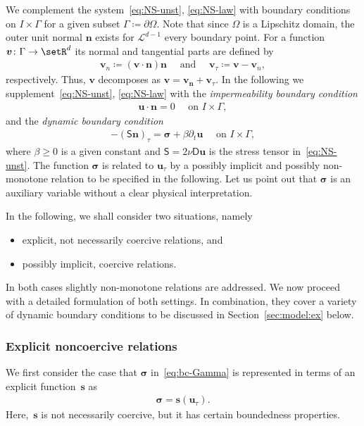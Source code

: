 \documentclass[reqno,a4paper]{amsart}
\def\tens#1{\pmb{\mathsf{#1}}}
\def\vec#1{\boldsymbol{#1}}
\def\bn{\vec{n}}
\def\bs{\vec{s}}
\def\bu{\vec{u}}
\def\bv{\vec{v}}
\def\bsigma{\vec{\sigma}}
\def\BD{\tens{D}}
\def\BS{\tens{S}}
\begin{document}
	We complement the system~\eqref{eq:NS-unst}, \eqref{eq:NS-law} with boundary conditions on $I \times \Gamma$ for a given subset $\Gamma \coloneqq \partial \Omega$. 
	Note that since $\Omega$ is a Lipschitz domain, the outer unit normal $\bn$ exists for $\mathcal{L}^{d-1}$ every boundary point. 
	For a function $\bv \colon \Gamma \to \setR^d$ its normal and tangential parts are defined by 
	\begin{align*}
		\bv_n  \coloneqq (\bv \cdot \bn) \bn 
		\quad \text{ and } \quad 
		\bv_{\tau} \coloneqq \bv - \bv_n,
	\end{align*}
	respectively. 
	Thus, $\bv$ decomposes as $\bv = \bv_{\bn} + \bv_{\tau}$. 
	In the following we supplement~\eqref{eq:NS-unst}, \eqref{eq:NS-law} with the \emph{impermeability boundary condition} 
	\begin{align}\label{eq:imperm}
		\bu \cdot \bn = 0 \quad \text{ on } I\times\Gamma,
	\end{align}	
	and the \emph{dynamic boundary condition}
	\begin{align}\label{eq:bc-Gamma}
		- (\BS \bn)_{\tau} = \bsigma + \beta \partial_t \bu \quad \text{ on } I\times\Gamma, 
	\end{align}
	where $\beta\geq 0$ is a given constant and $\BS = 2 \nu \BD \bu$ is the stress tensor in~\eqref{eq:NS-unst}. 
	The function $\bsigma$ is related to $\bu_{\tau}$ by a possibly implicit and possibly non-monotone relation to be specified in the following. 
	Let us point out that $\bsigma$ is an auxiliary variable without a clear physical interpretation. 
	
	In the following, we shall consider two situations, namely
	\begin{itemize}		
		\item 
		explicit, not necessarily coercive relations, and 
		\item 
		possibly implicit, coercive relations. 
	\end{itemize}
	In both cases slightly non-monotone relations are addressed. 
	We now proceed with a detailed formulation of both settings. 
	In combination, they cover a variety of dynamic boundary conditions to be discussed in Section~\ref{sec:model:ex} below. 
	
	\subsubsection{Explicit noncoercive relations}\label{sec:expl-rel} 
	
	We first consider the case that $\bsigma$ in~\eqref{eq:bc-Gamma} is represented in terms of an explicit function~$\mathcal{\bs}$ as
	\begin{align}\label{eq:expl-s}
		\bsigma = \mathcal{\bs}(\bu_\tau). 
	\end{align}
	Here,~$\mathcal{\bs}$  is not necessarily coercive, but it has certain boundedness properties.
	
\end{document}
